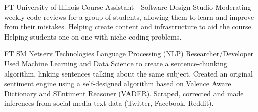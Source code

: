 \documentclass[10pt, oneside]{article} %
\begin{document}
\begin{paracol}{2}
{PT} %
{University of Illinois} %
{Course Assistant - Software Design Studio} %
{Moderating weekly code reviews for a group of students, allowing them to learn and improve from their mistakes. Helping create content and infrastructure to aid the course. Helping students one-on-one with niche coding problems.}%

{FT} %
{SM Netserv Technologies} %
{Language Processing (NLP) Researcher/Developer} %
{Used Machine Learning and Data Science to create a sentence-chunking algorithm, linking sentences talking about the same subject. Created an original sentiment engine using a self-designed algorithm based on Valence Aware Dictionary and SEntiment Reasoner (VADER). Scraped, corrected and made inferences from social media text data (Twitter, Facebook, Reddit).}%




\vspace{-\baselineskip}\medskip %

\switchcolumn %



\end{paracol}
\end{document}
